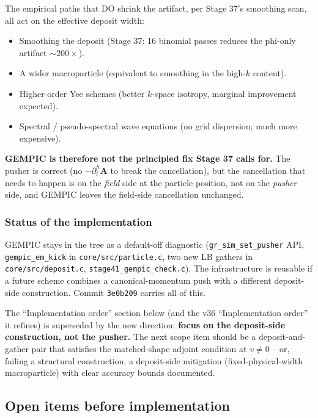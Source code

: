 \documentclass[11pt,a4paper]{article}
\newcommand{\vv}[1]{\mathbf{#1}}
\begin{document}
The empirical paths that DO shrink the artifact, per Stage 37's
smoothing scan, all act on the effective deposit width:
\begin{itemize}
  \item Smoothing the deposit (Stage 37: 16 binomial passes reduces
    the phi-only artifact $\sim 200\times$).
  \item A wider macroparticle (equivalent to smoothing in the
    high-$k$ content).
  \item Higher-order Yee schemes (better $k$-space isotropy, marginal
    improvement expected).
  \item Spectral / pseudo-spectral wave equations (no grid dispersion;
    much more expensive).
\end{itemize}

\textbf{GEMPIC is therefore not the principled fix Stage 37 calls for.}
The pusher is correct (no $-\partial^h_t\vv A$ to break the
cancellation), but the cancellation that needs to happen is on the
\emph{field} side at the particle position, not on the \emph{pusher}
side, and GEMPIC leaves the field-side cancellation unchanged.

\subsubsection*{Status of the implementation}

GEMPIC stays in the tree as a default-off diagnostic
(\texttt{gr\_sim\_set\_pusher} API, \texttt{gempic\_em\_kick} in
\texttt{core/src/particle.c}, two new LB gathers in
\texttt{core/src/deposit.c}, \texttt{stage41\_gempic\_check.c}).
The infrastructure is reusable if a future scheme combines a
canonical-momentum push with a different deposit-side construction.
Commit \texttt{3e0b209} carries all of this.

The ``Implementation order'' section below (and the v36
``Implementation order'' it refines) is superseded by the new
direction: \textbf{focus on the deposit-side construction, not the
pusher.}  The next scope item should be a deposit-and-gather pair
that satisfies the matched-shape adjoint condition at $v \ne 0$ --
or, failing a structural construction, a deposit-side mitigation
(fixed-physical-width macroparticle) with clear accuracy bounds
documented.

\subsection{Open items before implementation}
\end{document}
